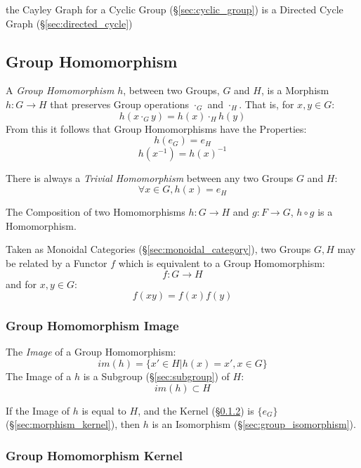 the Cayley Graph for a Cyclic Group (\S\ref{sec:cyclic_group}) is a
Directed Cycle Graph (\S\ref{sec:directed_cycle})



\subsection{Group Homomorphism}\label{sec:group_homomorphism}

A \emph{Group Homomorphism} $h$, between two Groups, $G$ and $H$, is a
Morphism $h : G \rightarrow H$ that preserves Group operations
$\cdot_G$ and $\cdot_H$. That is, for $x,y \in G$:
\[
    h(x \cdot_G y) = h(x) \cdot_H h(y)
\]
From this it follows that Group Homomorphisms have the Properties:
\[
    h(e_G) = e_H
\]\[
    h(x^{-1}) = h(x)^{-1}
\]

There is always a \emph{Trivial Homomorphism} between any two Groups
$G$ and $H$:
\[
    \forall x \in G, h (x) = e_H
\]

The Composition of two Homomorphisms $h : G \rightarrow H$ and $g : F
\rightarrow G$, $h \circ g$ is a Homomorphism.

Taken as Monoidal Categories (\S\ref{sec:monoidal_category}), two
Groups $G, H$ may be related by a Functor $f$ which is equivalent to a
Group Homomorphism:
\[
    f : G \rightarrow H
\]
and for $x,y \in G$:
\[
    f(xy) = f(x)f(y)
\]



\subsubsection{Group Homomorphism Image}\label{sec:group_image}

The \emph{Image} of a Group Homomorphism:
\[
    im(h) = \{ x' \in H | h(x) = x', x \in G \}
\]
The Image of a $h$ is a Subgroup (\S\ref{sec:subgroup}) of $H$:
\[
    im(h) \subset H
\]

If the Image of $h$ is equal to $H$, and the Kernel
(\S\ref{sec:group_kernel}) is $\{e_G\}$ (\S\ref{sec:morphism_kernel}),
then $h$ is an Isomorphism (\S\ref{sec:group_isomorphism}).



\subsubsection{Group Homomorphism Kernel}\label{sec:group_kernel}


